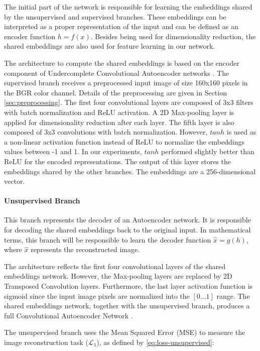 The initial part of the network is responsible for learning the embeddings shared by the unsupervised and supervised branches. These embeddings can be interpreted as a proper representation of the input and can be defined as an encoder function $h = f(x)$. Besides being used for dimensionality reduction, the shared embeddings are also used for feature learning in our network.

The architecture to compute the shared embeddings is based on the encoder component of Undercomplete Convolutional Autoencoder networks \citep[p.~500]{goodfellow2016deep}. The supervised branch receives a preprocessed input image of size 160x160 pixels in the BGR color channel. Details of the preprocessing are given in Section \ref{sec:preprocessing}. The first four convolutional layers are composed of 3x3 filters with batch normalization and ReLU activation. A 2D Max-pooling layer is applied for dimensionality reduction after each layer. The fifth layer is also composed of 3x3 convolutions with batch normalization. However, $tanh$ is used as a non-linear activation function instead of ReLU to normalize the embeddings values between -1 and 1. In our experiments, $tanh$ performed slightly better than ReLU for the encoded representations. The output of this layer stores the embeddings shared by the other branches. The embeddings are a 256-dimensional vector.

\paragraph{Unsupervised Branch}

This branch represents the decoder of an Autoencoder network. It is responsible for decoding the shared embeddings back to the original input. In mathematical terms, this branch will be responsible to learn the decoder function $\hat{x} = g(h)$, where $\hat{x}$ represents the reconstructed image. 

The architecture reflects the first four convolutional layers of the shared embeddings network. However, the Max-pooling layers are replaced by 2D Transposed Convolution layers. Furthermore, the last layer activation function is sigmoid since the input image pixels are normalized into the $[0...1]$ range. The shared embeddings network, together with the unsupervised branch, produces a full Convolutional Autoencoder Network \citep{goodfellow2016deep}.

The unsupervised branch uses the Mean Squared Error (MSE) to measure the image reconstruction task ($\mathcal{L}_1$), as defined by \autoref{eq:loss-unsupervised}:

